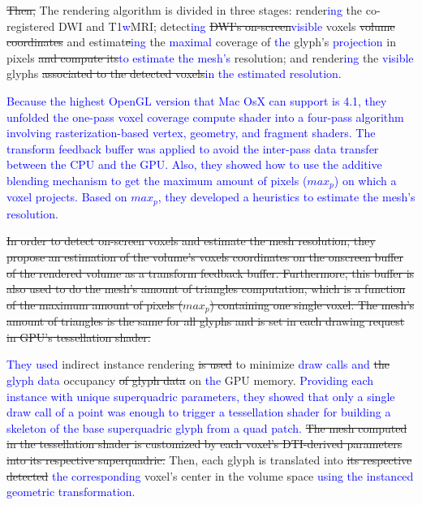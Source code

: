 \documentclass[twoside,twocolumn,10pt]{article}
\begin{document}
\sout{Then, }The rendering algorithm is divided in three stages: render\textcolor{blue}{ing} the co-registered DWI and T1\textcolor{blue}{w}MRI; detect\textcolor{blue}{ing} \sout{DWI's on-screen}\textcolor{blue}{visible} voxels \sout{volume coordinates} and estimat\sout{e}\textcolor{blue}{ing} the \textcolor{blue}{maximal} coverage of \textcolor{blue}{the} glyph's \textcolor{blue}{projection} in pixels \sout{and compute its}\textcolor{blue}{to estimate the mesh's} resolution; and render\textcolor{blue}{ing} the \textcolor{blue}{visible} glyphs \sout{associated to the detected voxels}\textcolor{blue}{in the estimated resolution}. %

\textcolor{blue}{Because the highest OpenGL version that Mac OsX can support is 4.1, they unfolded the one-pass voxel coverage compute shader into a four-pass algorithm involving rasterization-based vertex, geometry, and fragment shaders. The transform feedback buffer was applied to avoid the inter-pass data transfer between the CPU and the GPU. Also, they showed how to use the additive blending mechanism to get the maximum amount of pixels ($max_p$) on which a voxel projects.  Based on $max_p$, they developed a heuristics to estimate the mesh's resolution.}

\sout{In order to detect on-screen voxels and estimate the mesh resolution, they propose an estimation of the volume's voxels coordinates on the onscreen buffer of the rendered volume as a transform feedback buffer. Furthermore, this buffer is also used to do the mesh's amount of triangles computation, which is a function of the maximum amount of pixels ($max_p$) containing one single voxel. The mesh's amount of triangles is the same for all glyphs and is set in each drawing request in GPU's tessellation shader.}

\textcolor{blue}{They used} indirect instance rendering \sout{is used} to minimize \textcolor{blue}{draw calls and} \sout{the} \textcolor{blue}{glyph data} occupancy \sout{of glyph data} on \textcolor{blue}{the} GPU memory. \textcolor{blue}{Providing each instance with unique superquadric parameters, they showed that only a single draw call of a point was enough to trigger a tessellation shader for building a skeleton of the base superquadric glyph from a quad patch.} \sout{The mesh computed in the tessellation shader is customized by each voxel's DTI-derived parameters into its respective superquadric.} Then, each glyph is translated into \sout{its respective detected} \textcolor{blue}{the corresponding} voxel's center in the volume space \textcolor{blue}{using the instanced geometric transformation}.
\end{document}
